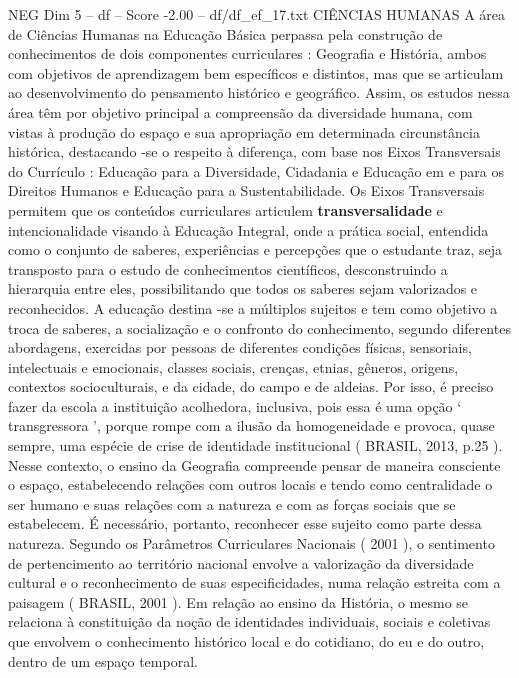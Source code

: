 \begin{textsample}{NEG Dim 5 – df – Score -2.00 – df/df\_ef\_17.txt}  \label{ex:f5_neg_131}
CIÊNCIAS HUMANAS A área de Ciências Humanas na Educação Básica perpassa pela construção de conhecimentos de dois componentes curriculares : Geografia e História, ambos com objetivos de aprendizagem bem específicos e distintos, mas que se articulam ao desenvolvimento do pensamento histórico e geográfico.
Assim, os estudos nessa área têm por objetivo principal a compreensão da diversidade humana, com vistas à produção do espaço e sua apropriação em determinada circunstância histórica, destacando -se o respeito à diferença, com base nos Eixos Transversais do Currículo : Educação para a Diversidade, Cidadania e Educação em e para os Direitos Humanos e Educação para a Sustentabilidade.
Os Eixos Transversais permitem que os conteúdos curriculares articulem \textbf{transversalidade} e intencionalidade visando à Educação Integral, onde a prática social, entendida como o conjunto de saberes, experiências e percepções que o estudante traz, seja transposto para o estudo de conhecimentos científicos, desconstruindo a hierarquia entre eles, possibilitando que todos os saberes sejam valorizados e reconhecidos.
A educação destina -se a múltiplos sujeitos e tem como objetivo a troca de saberes, a socialização e o confronto do conhecimento, segundo diferentes abordagens, exercidas por pessoas de diferentes condições físicas, sensoriais, intelectuais e emocionais, classes sociais, crenças, etnias, gêneros, origens, contextos socioculturais, e da cidade, do campo e de aldeias.
Por isso, é preciso fazer da escola a instituição acolhedora, inclusiva, pois essa é uma opção ‘ transgressora ’, porque rompe com a ilusão da homogeneidade e provoca, quase sempre, uma espécie de crise de identidade institucional ( BRASIL, 2013, p.25 ).
Nesse contexto, o ensino da Geografia compreende pensar de maneira consciente o espaço, estabelecendo relações com outros locais e tendo como centralidade o ser humano e suas relações com a natureza e com as forças sociais que se estabelecem.
É necessário, portanto, reconhecer esse sujeito como parte dessa natureza.
Segundo os Parâmetros Curriculares Nacionais ( 2001 ), o sentimento de pertencimento ao território nacional envolve a valorização da diversidade cultural e o reconhecimento de suas especificidades, numa relação estreita com a paisagem ( BRASIL, 2001 ).
Em relação ao ensino da História, o mesmo se relaciona à constituição da noção de identidades individuais, sociais e coletivas que envolvem o conhecimento histórico local e do cotidiano, do eu e do outro, dentro de um espaço temporal.

\end{textsample}
